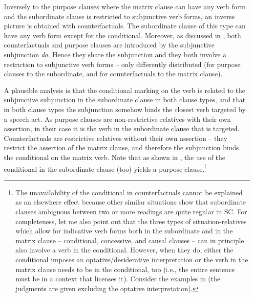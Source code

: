 \documentclass[output=paper,
colorlinks,
citecolor=brown,
newtxmath
]{langscibook}
\begin{document}
\noindent Inversely to the purpose clauses where the matrix clause can have any verb form and the subordinate clause is restricted to subjunctive verb forms, an inverse picture is obtained with counterfactuals. The subordinate clause of this type can have any verb form except for the conditional. Moreover, as discussed in , both counterfactuals and purpose clauses are introduced by the subjunctive subjunction \textit{da}. Hence they share the subjunction and they both involve a restriction to subjunctive verb forms -- only differently distributed (for purpose clauses to the subordinate, and for counterfactuals to the matrix clause).

\largerpage[2] %

A plausible analysis is that the conditional marking on the verb is related to the subjunctive subjunction in the subordinate clause in both clause types, and that in both clause types the subjunction somehow binds the closest verb targeted by a speech act. As purpose clauses are non-restrictive relatives with their own assertion, in their case it is the verb in the subordinate clause that is targeted. Counterfactuals are restrictive relatives without their own assertion -- they restrict the assertion of the matrix clause, and therefore the subjunction binds the conditional on the matrix verb. Note that as shown in , the use of the conditional in the subordinate clause (too) yields a purpose clause.\footnote{The unavailability of the conditional in counterfactuals cannot be explained as an elsewhere effect because other similar situations show that subordinate clauses ambiguous between two or more readings are quite regular in SC. For completeness, let me also point out that the three types of situation-relatives which allow for indicative verb forms both in the subordinate and in the matrix clause -- conditional, concessive, and causal clauses -- can in principle also involve a verb in the conditional. However, when they do, either the conditional imposes an optative/desiderative interpretation or the verb in the matrix clause needs to be in the conditional, too (i.e., the entire sentence must be in a context that licenses it). Consider the examples in  (the judgments are given excluding the optative interpretation).

}
\end{document}
